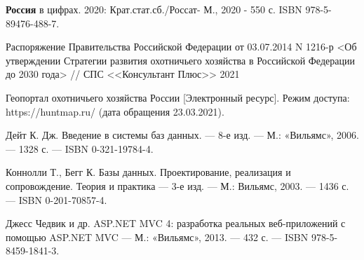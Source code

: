 \newpage
	\begin{thebibliography}{9} 
		
		 \textbf{Россия} в цифрах. 2020: Крат.стат.сб./Россат- М., 2020 - 550 с. ISBN 978-5-89476-488-7.
		
		 Распоряжение Правительства Российской Федерации от 03.07.2014 N 1216-р <Об утверждении Стратегии развития охотничьего хозяйства в Российской Федерации до 2030 года> // СПС <<Консультант Плюс>> 2021 
		
		 Геопортал охотничьего хозяйства России [Электронный ресурс]. Режим доступа: https://huntmap.ru/ (дата обращения 23.03.2021).
		
		 Дейт К. Дж. Введение в системы баз данных. — 8-е изд. — М.: «Вильямс», 2006. — 1328 с. — ISBN 0-321-19784-4.
		
		 Коннолли Т., Бегг К. Базы данных. Проектирование, реализация и сопровождение. Теория и практика — 3-е изд. — М.: Вильямс, 2003. — 1436 с. — ISBN 0-201-70857-4.
		
		 Джесс Чедвик и др. ASP.NET MVC 4: разработка реальных веб-приложений с помощью ASP.NET MVC — М.: «Вильямс», 2013. — 432 с. — ISBN 978-5-8459-1841-3.
		
	\end{thebibliography}
